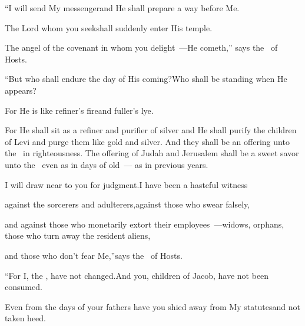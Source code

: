 
\begin{inparaenum}
  \pa{} ``I will send My messenger\pa{}and He shall prepare a way before Me.%

  \pb{}The Lord whom you seek\pa{}shall suddenly enter His temple.%

  \pc{}The angel of the covenant in whom you delight~---He cometh,'' says the \lord\ of Hosts.%

  \pa{} ``But who shall endure the day of His coming?\pa{}Who shall be standing when He appears?%

  \pb{}For He is like refiner's fire\pa{}and fuller's lye.%
  \smallskip%

  \noindent{} For He shall sit as a refiner and purifier of silver and He shall purify the children of Levi and purge them like gold and silver. And they shall be an offering unto the \lord\ in righteousness.%
   The offering of Judah and Jerusalem shall be a sweet savor unto the \lord\ even as in days of old~--- as in previous years.\smallskip%

  \pa{} I will draw near to you for judgment.\pa{}I have been a hasteful%
  witness%

  \pb{}against the sorcerers and adulterers,\pa{}against those who swear falsely,%

  \pb{}and against those who monetarily extort their employees~---\pa{}widows, orphans, those who turn away the resident aliens,%

  \pb{}and those who don't fear Me,''\pa{}says the \lord\ of Hosts.%

  \pa{} ``For I, the \lord, have not changed.\pa{}And you, children of Jacob, have not been consumed.%

  \pa{} Even from the days of your fathers have you shied away from My statutes\pa{}and not taken heed.%


\end{inparaenum}

